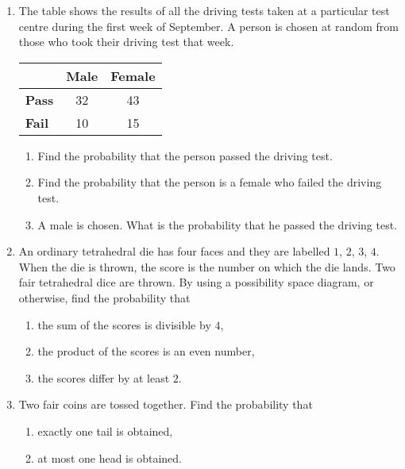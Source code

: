 \begin{enumerate}
\item The table shows the results of all the driving tests taken at a particular test centre during the first week of September. A person is chosen at random from those who took their driving test that week.
\begin{center}

		\begin{tabular}{l|c|c|}
			\cline{2-3}
			& \textbf{Male} & \textbf{Female} \\ \hline
			\multicolumn{1}{|l|}{\textbf{Pass}} & 32            & 43              \\ \hline
			\multicolumn{1}{|l|}{\textbf{Fail}} & 10            & 15              \\ \hline
		\end{tabular}

\end{center}


\begin{enumerate}
	\item Find the probability that the person passed the driving test.
	\item Find the probability that the person is a female who failed the driving test.
	\item A male is chosen. What is the probability that he passed  the driving test.
\end{enumerate}


\item An ordinary tetrahedral die has four faces and they are labelled $1$, $2$, $3$, $4$. When 	the die is thrown, the score is the number on which the die lands. Two fair tetrahedral dice are thrown. By using a possibility space diagram, or otherwise, find the probability that 
\begin{enumerate}
	\item the sum of the scores is divisible by $4$,
	\item the product of the scores is an even number,
	\item the scores differ by at least $2$. 
\end{enumerate} 

\item Two fair coins are tossed together. Find the probability that

\begin{enumerate}
	\item exactly one tail is obtained,
	\item at most one head is obtained.
\end{enumerate}


\end{enumerate}
